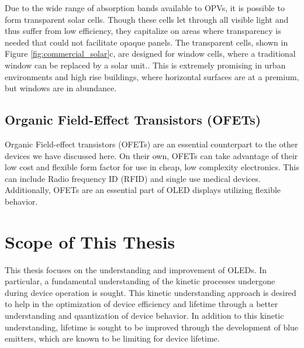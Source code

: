 \documentclass[../thesis.tex]{subfiles}
\begin{document}
Due to the wide range of absorption bands available to OPVs, it is possible to form transparent solar cells.
Though these cells let through all visible light and thus suffer from low efficiency, they capitalize on areas where transparency is needed that could not facilitate opaque panels.
The transparent cells, shown in Figure \ref{fig:commercial_solar}c, are designed for window cells, where a traditional window can be replaced by a solar unit..\supercite{Henion2017,Cuthbertson2017}
This is extremely promising in urban environments and high rise buildings, where horizontal surfaces are at a premium, but windows are in abundance.



\subsection{Organic Field-Effect Transistors (OFETs)}

Organic Field-effect transistors (OFETs) are an essential counterpart to the other devices we have discussed here.
On their own, OFETs can take advantage of their low cost and flexible form factor for use in cheap, low complexity electronics.  This can include Radio frequency ID (RFID) and single use medical devices.\supercite{Briseno2006a,Dimitrakopoulos2002,Sirringhaus2014,Yun2014,Briseno2006}
Additionally, OFETs are an essential part of OLED displays utilizing flexible behavior.

\section{Scope of This Thesis}

This thesis focuses on the understanding and improvement of OLEDs.
In particular, a fundamental understanding of the kinetic processes undergone during device operation is sought.
This kinetic understanding approach is desired to help in the optimization of device efficiency and lifetime through a better understanding and quantization of device behavior.
In addition to this kinetic understanding, lifetime is sought to be improved through the development of blue emitters, which are known to be limiting for device lifetime.



\end{document}
